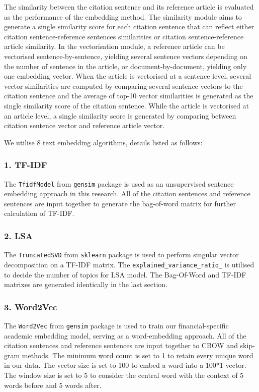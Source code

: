 The similarity between the citation sentence and its reference article is evaluated as the performance of the embedding method.
The similarity module aims to generate a single similarity score for each citation sentence that can reflect either citation sentence-reference sentences similarities or citation sentence-reference article similarity.
In the vectorisation module, a reference article can be vectorised sentence-by-sentence, yielding several sentence vectors depending on the number of sentence in the article, or document-by-document, yielding only one embedding vector.
When the article is vectorised at a sentence level, several vector similarities are computed by comparing several sentence vectors to the citation sentence and the average of top-10 vector similarities is generated as the single similarity score of the citation sentence.
While the article is vectorised at an article level, a single similarity score is generated by comparing between citation sentence vector and reference article vector.

We utilise 8 text embedding algorithms, details listed as follows:

\subsubsection{1. TF-IDF}
The \texttt{TfidfModel} from \texttt{gensim} package is used as an unsupervised sentence embedding approach in this research.
All of the citation sentences and reference sentences are input together to generate the bag-of-word matrix for further calculation of TF-IDF.

\subsubsection{2. LSA}
The \texttt{TruncatedSVD} from \texttt{sklearn} package is used to perform singular vector decomposition on a TF-IDF matrix.
The \texttt{explained\_variance\_ratio\_} is utilised to decide the number of topics for LSA model.
The Bag-Of-Word and TF-IDF matrixes are generated identically in the last section.

\subsubsection{3. Word2Vec}
The \texttt{Word2Vec} from \texttt{gensim} package is used to train our financial-specific academic embedding model, serving as a word-embedding approach.
All of the citation sentences and reference sentences are input together to CBOW and skip-gram methods.
The minimum word count is set to 1 to retain every unique word in our data.
The vector size is set to 100 to embed a word into a 100*1 vector.
The window size is set to 5 to consider the central word with the context of 5 words before and 5 words after.

